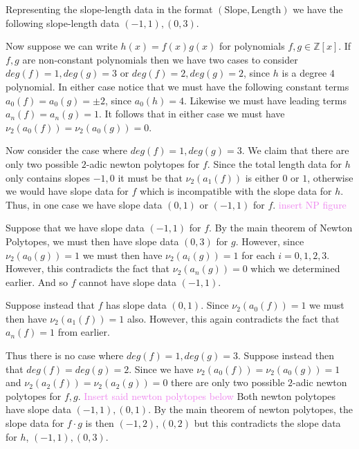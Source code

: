 \documentclass[12pt,letterpaper,boxed]{hmcpset}
\newcommand{\wg}[1]{\textcolor{violet}{#1}}
\newcommand{\Z}{\mathbb Z}
\begin{document}
\begin{solution}
\begin{itemize}
Representing the slope-length data in the format $(\text{Slope},
\text{Length})$ we have the following slope-length data $(-1, 1),
(0,3)$. 

Now suppose we can write $h(x) = f(x)g(x)$ for polynomials $f,g \in
\Z[x]$. If $f,g$ are non-constant polynomials then we have two cases
to consider $deg(f) = 1, deg(g) = 3$ or $deg(f) = 2, deg(g) = 2$,
since $h$ is a degree $4$ polynomial. In either case notice that we
must have the following constant terms $a_0(f) = a_0(g) = \pm 2$,
since $a_0(h) = 4$. Likewise we must have leading terms $a_n(f) =
a_n(g) = 1$. It follows that in either case we must have $\nu_2(a_0(f)) =
\nu_2(a_0(g)) = 0$. 

Now consider the case where $deg(f) = 1, deg(g) = 3$.
We claim that there are only two possible $2$-adic newton polytopes
for $f$. Since the total length data for $h$ only contains slopes
$-1,0$ it must be that $\nu_2(a_1(f))$ is either $0$ or $1$, otherwise
we would have slope data for $f$ which is incompatible with the slope
data for $h$.
Thus, in one case we have slope data $(0,1)$ or $(-1,1)$ for $f$. 
\wg{insert NP figure}

Suppose that we have slope data $(-1,1)$ for $f$. 
By the main theorem of Newton Polytopes, we must then have slope
data $(0,3)$ for $g$. However, since $\nu_2(a_0(g)) = 1$ we must then
have $\nu_2(a_i(g)) = 1$ for each $i=0,1,2,3$. However, this
contradicts the fact that $\nu_2(a_n(g)) = 0$ which we determined
earlier. And so $f$ cannot have slope data $(-1,1)$.

Suppose instead that $f$ has slope data $(0,1)$. Since $\nu_2(a_0(f))
= 1$ we must then have $\nu_2(a_1(f)) = 1$ also. However, this again
contradicts the fact that $a_n(f) = 1$ from earlier.

Thus there is no case where $deg(f) = 1, deg(g) = 3$. Suppose instead
then that $deg(f) = deg(g) = 2$. Since we have $\nu_2(a_0(f)) =
\nu_2(a_0(g)) = 1$ and $\nu_2(a_2(f)) = \nu_2(a_2(g)) = 0$ there are
only two possible $2$-adic newton polytopes for $f,g$.
\wg{Insert said newton polytopes below}
Both newton polytopes have slope data $(-1,1),(0,1)$. By the main
theorem of newton polytopes, the slope data for $f\cdot g$ is then 
$(-1, 2), (0,2)$ but this contradicts the slope data for $h$, $(-1,1),
(0,3)$.


\end{itemize}
\end{solution}
\end{document}
